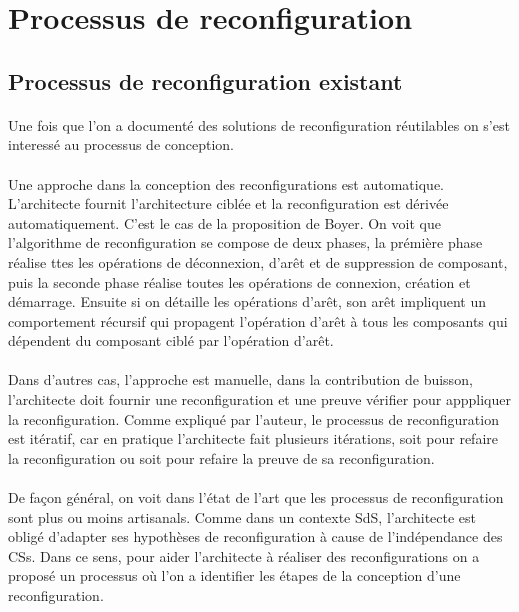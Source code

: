 \section{Processus de reconfiguration}

\subsection{Processus de reconfiguration existant}
\paragraph{}
Une fois que l'on a documenté des solutions de reconfiguration
réutilables on s'est interessé au processus de conception.

\paragraph{}
Une approche dans la conception des reconfigurations est automatique.
L'architecte fournit l'architecture ciblée et la reconfiguration est
dérivée automatiquement. C'est le cas de la
proposition de Boyer. On voit que l'algorithme de reconfiguration se
compose de deux phases, la prémière phase réalise ttes les opérations
de déconnexion, d'arêt et de suppression de composant, puis la seconde phase
réalise toutes les opérations de connexion, création et démarrage.
Ensuite si on détaille les opérations d'arêt, son arêt impliquent un
comportement récursif qui propagent l'opération d'arêt à tous les
composants qui dépendent du composant ciblé par l'opération d'arêt. 

\paragraph{}
Dans d'autres cas, l'approche est manuelle, dans la contribution de
buisson, l'architecte doit fournir
une reconfiguration et une preuve vérifier pour apppliquer la reconfiguration. 
Comme expliqué par l'auteur, le processus de reconfiguration est
itératif, car en pratique l'architecte fait plusieurs itérations, soit
pour refaire la reconfiguration ou soit pour refaire la preuve de sa
reconfiguration.

\paragraph{}
De façon général, on voit dans l'état de l'art que les processus de
reconfiguration sont plus ou moins artisanals. Comme dans un contexte SdS,
l'architecte est obligé d'adapter ses hypothèses de reconfiguration à
cause de l'indépendance des CSs. Dans ce sens, pour aider l'architecte
à réaliser des reconfigurations on a proposé un processus où l'on a
identifier les étapes de la conception d'une reconfiguration. 


